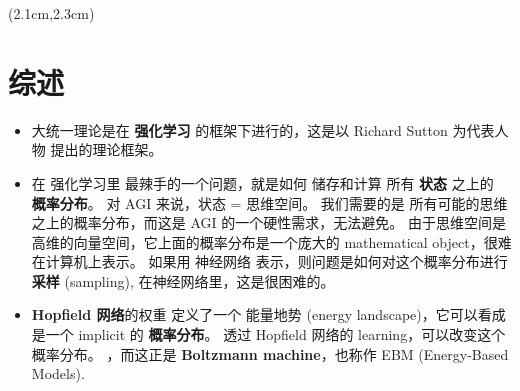 \begin{preview}

\cc{
\title{\vspace{-1.5cm} \bfseries\color{blue}{\LARGE AGI 大统一理论}}
}{
\title{\vspace{-1.5cm} \bfseries\color{blue}{\LARGE AGI Grand Unification}}
}

\date{\vspace{-2cm}} %

\maketitle

\setcounter{section}{-1}
\setcounter{mypage}{1}

\begin{textblock*}{5cm}(2.1cm,2.3cm) %
{\color{red}{\large \textcircled{\small \themypage}}}
\addtocounter{mypage}{1}
\end{textblock*}

\begin{minipage}{\textwidth}
\setlength{\parskip}{0.4\baselineskip}

\section{综述}

\begin{itemize}

	\item 大统一理论是在 \textbf{强化学习} 的框架下进行的，这是以 Richard Sutton 为代表人物 提出的理论框架。 

	\item 在 强化学习里 最辣手的一个问题，就是如何 储存和计算 所有 \textbf{状态} 之上的 \textbf{概率分布}。 对 AGI 来说，状态 = 思维空间。 我们需要的是 所有可能的思维之上的概率分布，而这是 AGI 的一个硬性需求，无法避免。 由于思维空间是高维的向量空间，它上面的概率分布是一个庞大的 mathematical object，很难在计算机上表示。 如果用 神经网络 表示，则问题是如何对这个概率分布进行 \textbf{采样} (sampling), 在神经网络里，这是很困难的。

	\item \textbf{Hopfield 网络}的权重 定义了一个 能量地势 (energy landscape)，它可以看成是一个 implicit 的 \textbf{概率分布}。 透过 Hopfield 网络的 learning，可以改变这个概率分布。 ，而这正是 \textbf{Boltzmann machine}，也称作 EBM (Energy-Based Models).


\end{itemize}
\end{minipage}
\end{preview}
